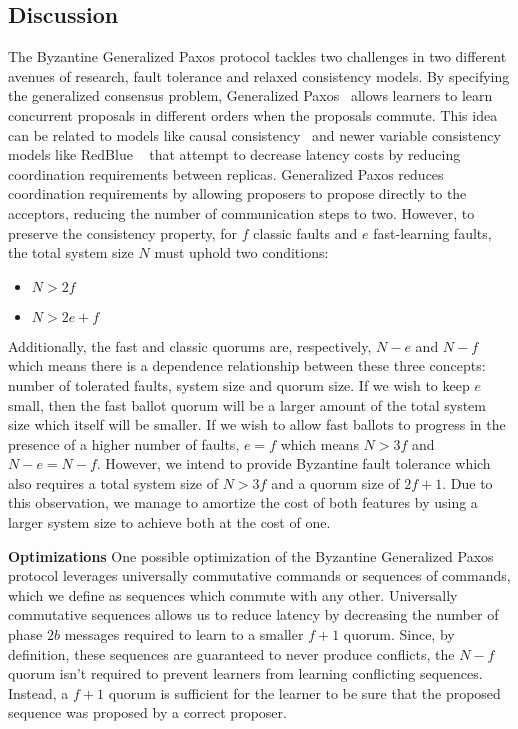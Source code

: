 \subsection{Discussion}

The Byzantine Generalized Paxos protocol tackles two challenges in two different avenues of research, fault tolerance and relaxed consistency models. By specifying the generalized consensus problem, Generalized Paxos~\cite{Lamport2005} allows learners to learn concurrent proposals in different orders when the proposals commute. This idea can be related to models like causal consistency~\cite{Ahamad1995} and newer variable consistency models like RedBlue ~\cite{Li2012} that attempt to decrease latency costs by reducing coordination requirements between replicas. Generalized Paxos reduces coordination requirements by allowing proposers to propose directly to the acceptors, reducing the number of communication steps to two. However, to preserve the consistency property, for $f$ classic faults and $e$ fast-learning faults, the total system size $N$ must uphold two conditions:
\begin{itemize}
	\item $N > 2f$
	\item $N > 2e+f$
\end{itemize} 
Additionally, the fast and classic quorums are, respectively, $N-e$ and $N-f$ which means there is a dependence relationship between these three concepts: number of tolerated faults, system size and quorum size. If we wish to keep $e$ small, then the fast ballot quorum will be a larger amount of the total system size which itself will be smaller. If we wish to allow fast ballots to progress in the presence of a higher number of faults, $e=f$ which means $N >3f$ and $N-e=N-f$. However, we intend to provide Byzantine fault tolerance which also requires a total system size of $N>3f$ and a quorum size of $2f+1$. Due to this observation, we manage to amortize the cost of both features by using a larger system size to achieve both at the cost of one. \par
\textbf{Optimizations} One possible optimization of the Byzantine Generalized Paxos protocol leverages universally commutative commands or sequences of commands, which we define as sequences which commute with any other. Universally commutative sequences allows us to reduce latency by decreasing the number of phase $2b$ messages required to learn to a smaller $f+1$ quorum. Since, by definition, these sequences are guaranteed to never produce conflicts, the $N-f$ quorum isn't required to prevent learners from learning conflicting sequences. Instead, a $f+1$ quorum is sufficient for the learner to be sure that the proposed sequence was proposed by a correct proposer. 